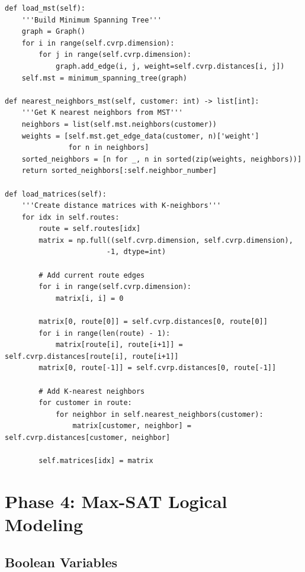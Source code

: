 \documentclass[12pt,a4paper]{article}
\theoremstyle{definition}
\begin{document}
\begin{lstlisting}[caption={K-Nearest Neighbors using MST}]
def load_mst(self):
    '''Build Minimum Spanning Tree'''
    graph = Graph()
    for i in range(self.cvrp.dimension):
        for j in range(self.cvrp.dimension):
            graph.add_edge(i, j, weight=self.cvrp.distances[i, j])
    self.mst = minimum_spanning_tree(graph)

def nearest_neighbors_mst(self, customer: int) -> list[int]:
    '''Get K nearest neighbors from MST'''
    neighbors = list(self.mst.neighbors(customer))
    weights = [self.mst.get_edge_data(customer, n)['weight'] 
               for n in neighbors]
    sorted_neighbors = [n for _, n in sorted(zip(weights, neighbors))]
    return sorted_neighbors[:self.neighbor_number]

def load_matrices(self):
    '''Create distance matrices with K-neighbors'''
    for idx in self.routes:
        route = self.routes[idx]
        matrix = np.full((self.cvrp.dimension, self.cvrp.dimension), 
                        -1, dtype=int)
        
        # Add current route edges
        for i in range(self.cvrp.dimension):
            matrix[i, i] = 0
        
        matrix[0, route[0]] = self.cvrp.distances[0, route[0]]
        for i in range(len(route) - 1):
            matrix[route[i], route[i+1]] = self.cvrp.distances[route[i], route[i+1]]
        matrix[0, route[-1]] = self.cvrp.distances[0, route[-1]]
        
        # Add K-nearest neighbors
        for customer in route:
            for neighbor in self.nearest_neighbors(customer):
                matrix[customer, neighbor] = self.cvrp.distances[customer, neighbor]
        
        self.matrices[idx] = matrix
\end{lstlisting}

\section{Phase 4: Max-SAT Logical Modeling}

\subsection{Boolean Variables}
\end{document}

